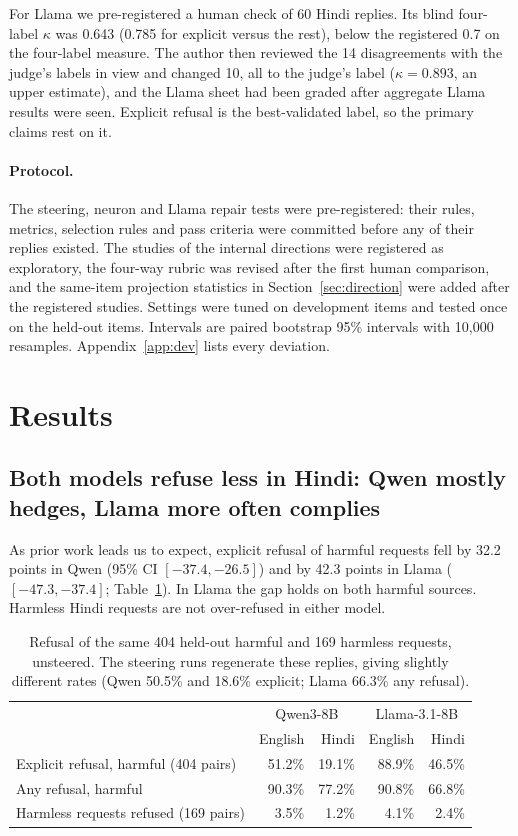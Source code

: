 \documentclass[11pt]{article}
\begin{document}
For Llama we pre-registered a human check of 60 Hindi replies. Its blind four-label $\kappa$ was 0.643 (0.785 for explicit versus the rest), below the registered 0.7 on the four-label measure. The author then reviewed the 14 disagreements with the judge's labels in view and changed 10, all to the judge's label ($\kappa=0.893$, an upper estimate), and the Llama sheet had been graded after aggregate Llama results were seen. Explicit refusal is the best-validated label, so the primary claims rest on it.

\paragraph{Protocol.} The steering, neuron and Llama repair tests were pre-registered: their rules, metrics, selection rules and pass criteria were committed before any of their replies existed. The studies of the internal directions were registered as exploratory, the four-way rubric was revised after the first human comparison, and the same-item projection statistics in Section~\ref{sec:direction} were added after the registered studies. Settings were tuned on development items and tested once on the held-out items. Intervals are paired bootstrap 95\% intervals with 10,000 resamples. Appendix~\ref{app:dev} lists every deviation.

\section{Results}
\subsection{Both models refuse less in Hindi: Qwen mostly hedges, Llama more often complies}\label{sec:gap}
As prior work leads us to expect, explicit refusal of harmful requests fell by 32.2 points in Qwen (95\% CI $[-37.4,-26.5]$) and by 42.3 points in Llama ($[-47.3,-37.4]$; Table~\ref{tab:gap}). In Llama the gap holds on both harmful sources. Harmless Hindi requests are not over-refused in either model.

\begin{table}[t]\centering\small
\begin{tabular}{lrrrr}\toprule
 & \multicolumn{2}{c}{Qwen3-8B} & \multicolumn{2}{c}{Llama-3.1-8B} \\
 & English & Hindi & English & Hindi \\\midrule
Explicit refusal, harmful (404 pairs) & 51.2\% & 19.1\% & 88.9\% & 46.5\% \\
Any refusal, harmful & 90.3\% & 77.2\% & 90.8\% & 66.8\% \\
Harmless requests refused (169 pairs) & 3.5\% & 1.2\% & 4.1\% & 2.4\% \\\bottomrule
\end{tabular}
\caption{Refusal of the same 404 held-out harmful and 169 harmless requests, unsteered. The steering runs regenerate these replies, giving slightly different rates (Qwen 50.5\% and 18.6\% explicit; Llama 66.3\% any refusal).}\label{tab:gap}
\end{table}
\end{document}
